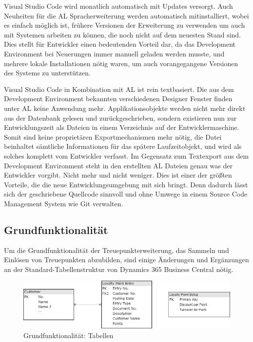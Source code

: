 Visual Studio Code wird monatlich automatisch mit Updates versorgt. Auch Neuheiten für die AL Spracherweiterung werden automatisch mitinstalliert, wobei es einfach möglich ist, frühere Versionen der Erweiterung zu verwenden um auch mit Systemen arbeiten zu können, die noch nicht auf dem neuesten Stand sind. Dies stellt für Entwickler einen bedeutenden Vorteil dar, da das Development Environment bei Neuerungen immer manuell geladen werden musste, und mehrere lokale Installationen nötig waren, um auch vorangegangene Versionen des Systems zu unterstützen.
\linebreak

Visual Studio Code in Kombination mit AL ist rein textbasiert. Die aus dem Development Environment bekannten verschiedenen Designer Fenster finden unter AL keine Anwendung mehr. Applikationsobjekte werden nicht mehr direkt aus der Datenbank gelesen und zurückgeschrieben, sondern existieren nun zur Entwicklungszeit als Dateien in einem Verzeichnis auf der Entwicklermaschine. Somit sind keine proprietären Exportmechanismen mehr nötig, die Datei beinhaltet sämtliche Informationen für das spätere Laufzeitobjekt, und wird als solches komplett vom Entwickler verfasst. Im Gegensatz zum Textexport aus dem Development Environment steht in den erstellten AL Dateien genau was der Entwickler vorgibt. Nicht mehr und nicht weniger. Dies ist einer der größten Vorteile, die die neue Entwicklungsumgebung mit sich bringt. Denn dadurch lässt sich der geschriebene Quellcode sinnvoll und ohne Umwege in einem Source Code Management System wie Git verwalten.


\subsection{Grundfunktionalität}
Um die Grundfunktionalität der Treuepunkterweiterung, das Sammeln und Einlösen von Treuepunkten abzubilden, sind einige Änderungen und Ergänzungen an der Standard-Tabellenstruktur von Dynamics 365 Business Central nötig. 

\begin{figure}[h]
	\centering
	\includegraphics[width=130mm]{images/Tables}
	\caption{Grundfunktionalität: Tabellen}
	\label{fig:Tables}
\end{figure}

